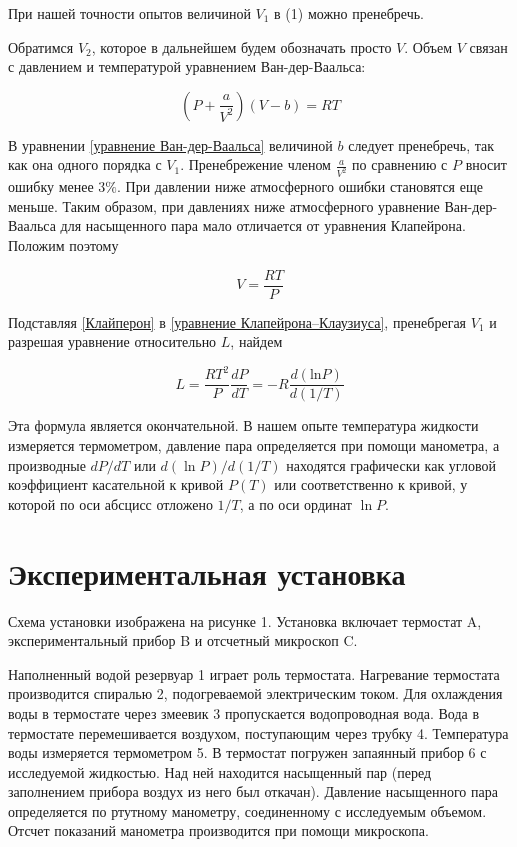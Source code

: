 \documentclass[a4paper,12pt]{article} %
\begin{document}
	
	\indent При нашей точности опытов величиной $V_{1}$ в (1) можно пренебречь.
	
	\indent Обратимся $V_{2}$, которое в дальнейшем будем обозначать
	просто $V$. Объем $V$ связан с давлением и температурой уравнением Ван-дер-Ваальса:
	
	\begin{equation} \label{уравнение Ван-дер-Ваальса}
		\left(P + \frac{a}{V^2}\right)(V - b) = RT
	\end{equation}
	
	\indent В уравнении \eqref{уравнение Ван-дер-Ваальса} величиной $b$ следует пренебречь, так как она одного порядка с $V_{1}$. Пренебрежение членом $\frac{a}{V^2}$ по сравнению с $P$ вносит ошибку менее 3$\%$. При давлении ниже атмосферного ошибки становятся еще меньше. Таким образом, при давлениях ниже атмосферного уравнение Ван-дер-Ваальса для насыщенного пара мало отличается от уравнения Клапейрона.
	Положим поэтому
	
	\begin{equation} \label{Клайперон}
		V = \frac{RT}{P}
	\end{equation}
	
	Подставляя \eqref{Клайперон} в \eqref{уравнение Клапейрона–Клаузиуса}, пренебрегая $V_{1}$ и разрешая уравнение относительно $L$, найдем
	
	\begin{equation}
		L = \frac{RT^2}{P}\frac{dP}{dT} = -R\frac{d(\text{ln} P)}{d(1/T)}
	\end{equation}
	
	Эта формула является окончательной.
	В нашем опыте температура жидкости измеряется термометром, давление пара определяется при помощи манометра, а производные $dP/dT$ или $d(\ln P)/d(1/T)$ находятся графически как угловой коэффициент касательной к кривой $P(T)$ или соответственно к кривой, у которой по оси абсцисс отложено $1/T$, а по оси ординат $\ln P$.
	
	\section*{Экспериментальная установка} 
	Схема установки изображена на рисунке 1. Установка включает термостат A, экспериментальный прибор B и отсчетный микроскоп C. 
	
	Наполненный водой резервуар 1 играет роль термостата. Нагревание термостата производится спиралью 2, подогреваемой электрическим током. Для охлаждения воды в термостате через змеевик 3 пропускается водопроводная вода. Вода в термостате перемешивается воздухом, поступающим через трубку 4. Температура воды измеряется термометром 5. В термостат погружен запаянный прибор 6 с исследуемой жидкостью. Над ней находится насыщенный пар (перед заполнением прибора воздух из него был откачан). Давление насыщенного пара определяется по ртутному манометру, соединенному с исследуемым объемом. Отсчет показаний манометра производится при помощи микроскопа. 
	
\end{document}
